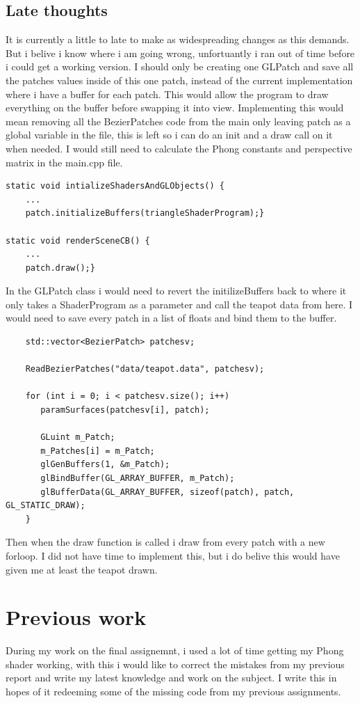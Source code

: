 \documentclass{article}
\begin{document}
\subsection{Late thoughts}
It is currently a little to late to make as widespreading changes as
this demands. But i belive i know where i am going wrong, unfortuantly i ran out of time
before i could get a working version.
I should only be creating one GLPatch and save all the patches values inside of this one 
patch, instead of the current implementation where i have a buffer for each patch. This would allow the program to draw everything on
the buffer before swapping it into view. 
Implementing this would mean removing all the BezierPatches code from the main only leaving
patch as a global variable in the file, this is left so i can do an init and a draw call on it when needed.
I would still need to calculate the Phong constants and perspective matrix in the main.cpp file.
\begin{verbatim}
static void intializeShadersAndGLObjects() {
    ...
    patch.initializeBuffers(triangleShaderProgram);}

static void renderSceneCB() {
    ...
    patch.draw();}
\end{verbatim}
In the GLPatch class i would need to revert the initilizeBuffers back
to where it only takes a ShaderProgram as a parameter and call the teapot data
from here. I would need to save every patch in a list of floats and bind them to
the buffer.
\begin{verbatim}
    std::vector<BezierPatch> patchesv;

    ReadBezierPatches("data/teapot.data", patchesv);

    for (int i = 0; i < patchesv.size(); i++)
       paramSurfaces(patchesv[i], patch); 

       GLuint m_Patch;
       m_Patches[i] = m_Patch;
       glGenBuffers(1, &m_Patch);
       glBindBuffer(GL_ARRAY_BUFFER, m_Patch);
       glBufferData(GL_ARRAY_BUFFER, sizeof(patch), patch, GL_STATIC_DRAW);
    }
\end{verbatim}
Then when the draw function is called i draw from every patch with a new forloop. 
I did not have time to implement this, but i do belive this would have given me at 
least the teapot drawn.
\section{Previous work}

During my work on the final assignemnt, i used a lot of time getting my Phong shader
working, with this i would like to correct the mistakes from my previous report and
write my latest knowledge and work on the subject. I write this in hopes of it redeeming
some of the missing code from my previous assignments.
\end{document}
